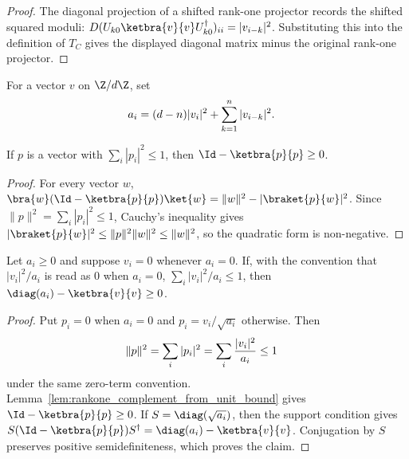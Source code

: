 \begin{proof}
    \leanok
    The diagonal projection of a shifted rank-one projector records the shifted
    squared moduli:
    $D(U_{k0}\ketbra{v}{v}U_{k0}^{\dagger})_{ii}=|v_{i-k}|^2$.
    Substituting this into the definition of $T_C$ gives the displayed diagonal
    matrix minus the original rank-one projector.
\end{proof}

\begin{definition}
    \label{def:choi_type_rankone_weight}
    \leanok
    For a vector $v$ on $\Z/d\Z$, set
    \begin{align}
        a_i
         & =(d-n)|v_i|^2+\sum_{k=1}^n |v_{i-k}|^2.
        \notag
    \end{align}
\end{definition}

\begin{lemma}
    \label{lem:rankone_complement_from_unit_bound}
    \leanok
    If $p$ is a vector with $\sum_i |p_i|^2\le 1$, then
    $\Id-\ketbra{p}{p}\ge 0$.
\end{lemma}

\begin{proof}
    \leanok
    For every vector $w$,
    $\bra{w}(\Id-\ketbra{p}{p})\ket{w}
        =\|w\|^2-|\braket{p}{w}|^2$.
    Since $\|p\|^2=\sum_i |p_i|^2\le 1$, Cauchy's inequality gives
    $|\braket{p}{w}|^2\le \|p\|^2\|w\|^2\le \|w\|^2$, so the quadratic form is
    non-negative.
\end{proof}

\begin{lemma}
    \label{lem:diagonal_rankone_schur_complement}
    \leanok
    Let $a_i\ge0$ and suppose $v_i=0$ whenever $a_i=0$. If, with the convention
    that $|v_i|^2/a_i$ is read as $0$ when $a_i=0$,
    $\sum_i |v_i|^2/a_i\le 1$, then
    $\diag(a_i)-\ketbra{v}{v}\ge 0$.
\end{lemma}

\begin{proof}
    \leanok
    Put $p_i=0$ when $a_i=0$ and $p_i=v_i/\sqrt{a_i}$ otherwise. Then
    \begin{align}
        \|p\|^2
         & =\sum_i |p_i|^2
        =\sum_i \frac{|v_i|^2}{a_i}
        \le 1
        \notag
    \end{align}
    under the same zero-term convention.
    Lemma~\ref{lem:rankone_complement_from_unit_bound}
    gives $\Id-\ketbra{p}{p}\ge0$. If $S=\diag(\sqrt{a_i})$, then
    the support condition gives
    $S(\Id-\ketbra{p}{p})S^\dagger=\diag(a_i)-\ketbra{v}{v}$.
    Conjugation by $S$ preserves positive semidefiniteness, which proves the
    claim.
\end{proof}

